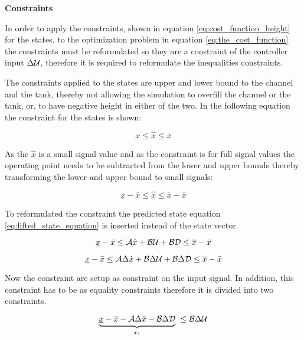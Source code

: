 \textbf{Constraints}

In order to apply the constraints, shown in equation \ref{eq:cost_function_height} for the states, to the optimization problem in equation \ref{eq:the_cost_function} the constraints must be reformulated so they are a constraint of the controller input $\Delta\CMcal{U}$, therefore it is required to reformulate the inequalities constraints. 

The constraints applied to the states are upper and lower bound to the channel and the tank, thereby not allowing the simulation to overfill the channel or the tank, or, to have negative height in either of the two. In the following equation the constraint for the states is shown:  


\begin{equation}
	\underline{x} \leq \hat{x} \leq \overline{x}
\end{equation}

As the $\hat{x}$ is a small signal value and as the constraint is for full signal values the operating point needs to be subtracted from the lower and upper bounds thereby transforming the lower and upper bound to small signals:

\begin{equation}
	\underline{x}- \bar{x} \leq \hat{x} \leq \overline{x}-\bar{x}
\end{equation}

To reformulated the constraint the predicted state equation \ref{eq:lifted_state_equation} is inserted instead of the state vector.

\begin{equation}
 	\underline{x}- \bar{x} \leq \CMcal{A}\hat{x}+\CMcal{B}\CMcal{U}+\CMcal{BD} \leq \overline{x}-\bar{x}
 \end{equation} 



\begin{equation}
 	\underline{x}- \bar{x} \leq \CMcal{A}\Delta\hat{x}+\CMcal{B}\Delta\CMcal{U}+\CMcal{B}\Delta\CMcal{D} \leq \overline{x}-\bar{x}
 \end{equation} 


 Now the constraint are setup as constraint on the input signal. In addition, this constraint has to be as equality constraints therefore it is divided into two constraints. 

 \begin{equation}
   	\underbrace{\underline{x}- \bar{x}-\CMcal{A}\Delta\hat{x}-\CMcal{B}\Delta\CMcal{D}}_{x_1}\  \leq \CMcal{B}\Delta\CMcal{U}
 \end{equation}  

